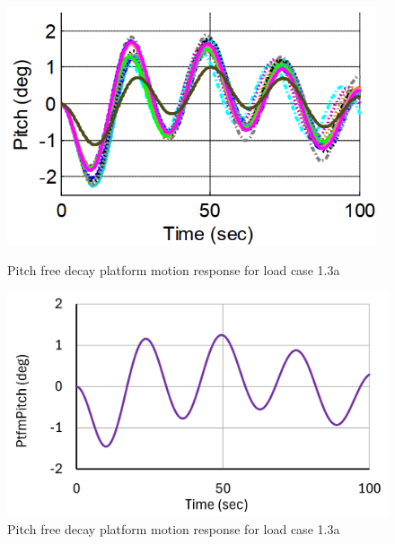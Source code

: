 \documentclass[a4paper, 11pt]{article}
\begin{document}
\begin{figure}[H]
    \begin{minipage}{0.48\textwidth}
        \centering
        \includegraphics[width=0.97\textwidth]{1.3a_pitch.png}
        \caption{\small Pitch free decay platform motion response for load case 1.3a \cite{Robertson2014}}
        \label{fig:1.3a_pitch}
    \end{minipage}
    \hfill
    \begin{minipage}{0.49\textwidth}
        \centering
        \includegraphics[width=1\textwidth]{1.3a_pitch_mine.png}
        \caption{\small Pitch free decay platform motion response for load case 1.3a}
        \label{fig:1.3a_pitch_mine}
    \end{minipage}
\end{figure}
\end{document}
